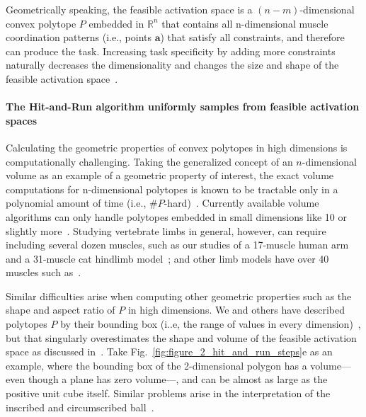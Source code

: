 \documentclass[9pt,twocolumn,twoside,lineno]{pnas-new}
\begin{document}
{Geometrically speaking, the feasible activation space is a $(n-m)$-dimensional convex polytope $P$ embedded in $\mathbb{R}^n$ that contains all n-dimensional muscle coordination patterns (i.e., points $\textbf{a}$) that satisfy all constraints, and therefore can produce the task. Increasing task specificity by adding more constraints naturally decreases the dimensionality and changes the size and shape of the feasible activation space~\cite{Kuo1993Human,sohn2013cat_bounding_box,inouye2016muscle}.


\paragraph*{The Hit-and-Run algorithm uniformly samples from feasible activation spaces}
\label{ss:hitrun}

Calculating the geometric properties of convex polytopes in high dimensions is computationally challenging. Taking the generalized concept of an $n$-dimensional volume as an example of a geometric property of interest, the exact volume computations for n-dimensional polytopes is known to be tractable only in a polynomial amount of time (i.e., $\#P$-hard)~\cite{Dyer}.
Currently available volume algorithms can only handle polytopes embedded in small dimensions like 10 or slightly more~\cite{Bueler2}. Studying vertebrate limbs in general, however, can require including several dozen muscles, such as our studies of a 17-muscle human arm and a 31-muscle cat hindlimb model~\cite{Valero-Cuevas2015high-dimensional}; and other limb models have over 40 muscles such as~\cite{arnold2010model, kutch2012challenges, hamner2010muscle, de2014human}.

Similar difficulties arise when computing other geometric properties such as the shape and aspect ratio of $P$ in high dimensions. We and others have described polytopes $P$ by their bounding box (i..e, the range of values in every dimension)~\cite{sohn2013cat_bounding_box,kutch2011muscle}, but that singularly overestimates the shape and volume of the feasible activation space as discussed in~\cite{Valero-Cuevas2015high-dimensional}.
Take Fig.~\ref{fig:figure_2_hit_and_run_steps}e as an example, where the bounding box of the 2-dimensional polygon has a volume---even though a plane has zero volume---, and can be almost as large as the positive unit cube itself. Similar problems arise in the interpretation of the inscribed and circumscribed ball~\cite{inouye2014optimizing}.

}
\end{document}
